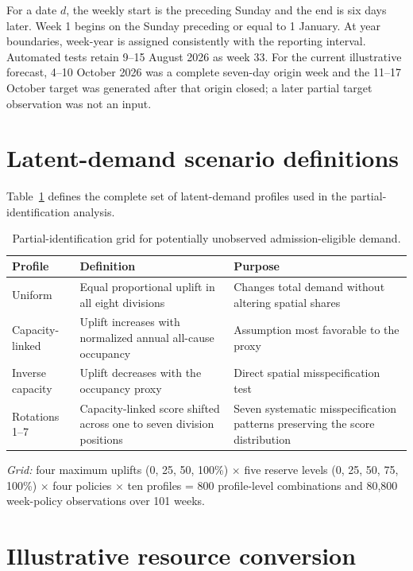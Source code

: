 \documentclass[11pt]{article}
\begin{document}
For a date $d$, the weekly start is the preceding Sunday and the end is six days later. Week 1 begins on the Sunday preceding or equal to 1 January. At year boundaries, week-year is assigned consistently with the reporting interval. Automated tests retain 9--15 August 2026 as week 33. For the current illustrative forecast, 4--10 October 2026 was a complete seven-day origin week and the 11--17 October target was generated after that origin closed; a later partial target observation was not an input.

\section{Latent-demand scenario definitions}

Table~\ref{tab:scenarios} defines the complete set of latent-demand profiles used in the partial-identification analysis.

\begin{table}[H]
\centering
\caption{Partial-identification grid for potentially unobserved admission-eligible demand.}
\label{tab:scenarios}
\small
\begin{tabularx}{\textwidth}{@{}p{}X p{}@{}}
\toprule
Profile & Definition & Purpose \\
\midrule
Uniform & Equal proportional uplift in all eight divisions & Changes total demand without altering spatial shares \\
Capacity-linked & Uplift increases with normalized annual all-cause occupancy & Assumption most favorable to the proxy \\
Inverse capacity & Uplift decreases with the occupancy proxy & Direct spatial misspecification test \\
Rotations 1--7 & Capacity-linked score shifted across one to seven division positions & Seven systematic misspecification patterns preserving the score distribution \\
\bottomrule
\end{tabularx}
\begin{minipage}{0.95\textwidth}
\footnotesize\emph{Grid:} four maximum uplifts (0, 25, 50, 100\%) $\times$ five reserve levels (0, 25, 50, 75, 100\%) $\times$ four policies $\times$ ten profiles = 800 profile-level combinations and 80,800 week-policy observations over 101 weeks.
\end{minipage}
\end{table}

\section{Illustrative resource conversion}
\end{document}
